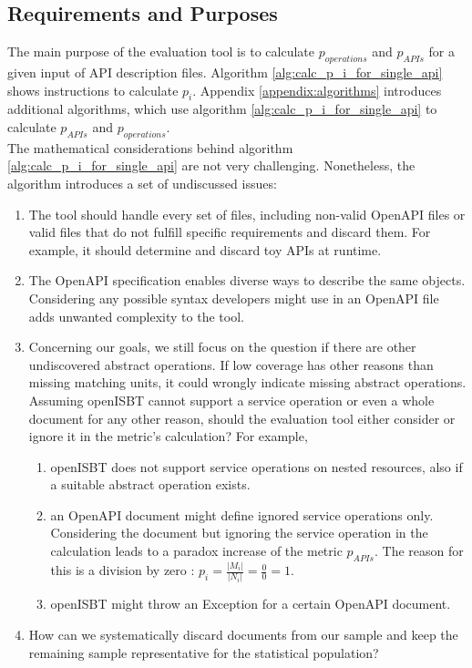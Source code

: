 \subsection{Requirements and Purposes}
\label{sec:eval_tool:general_considerations}
The main purpose of the evaluation tool is to calculate \(p_{operations}\) and \(p_{APIs}\) for a given input of API description files. Algorithm \ref{alg:calc_p_i_for_single_api} shows instructions to calculate \(p_{i}\). Appendix \ref{appendix:algorithms} introduces additional algorithms, which use algorithm \ref{alg:calc_p_i_for_single_api} to calculate \(p_{APIs}\) and \(p_{operations}\).\\



The mathematical considerations behind algorithm \ref{alg:calc_p_i_for_single_api} are not very challenging. Nonetheless, the algorithm introduces a set of undiscussed issues:

\begin{enumerate}
    \item The tool should handle every set of files, including non-valid OpenAPI files or valid files that do not fulfill specific requirements and discard them. For example, it should determine and discard toy APIs at runtime.
    \item The OpenAPI specification enables diverse ways to describe the same objects. Considering any possible syntax developers might use in an OpenAPI file adds unwanted complexity to the tool. 
    \item Concerning our goals, we still focus on the question if there are other undiscovered abstract operations. If low coverage has other reasons than missing matching units, it could wrongly indicate missing abstract operations. Assuming openISBT cannot support a service operation or even a whole document for any other reason, should the evaluation tool either consider or ignore it in the metric's calculation? For example, 
    \begin{enumerate}
        \item openISBT does not support service operations on nested resources, also if a suitable abstract operation exists.
        \item an OpenAPI document might define ignored service operations only. Considering the document but ignoring the service operation in the calculation leads to a paradox increase of the metric \(p_{APIs}\). The reason for this is a division by zero : \(p_i = \frac{|M_i|}{|N_i|} = \frac{0}{0} = 1\).
        \item openISBT might throw an Exception for a certain OpenAPI document.
    \end{enumerate}
    \item How can we systematically discard documents from our sample and keep the remaining sample representative for the statistical population?
\end{enumerate}

